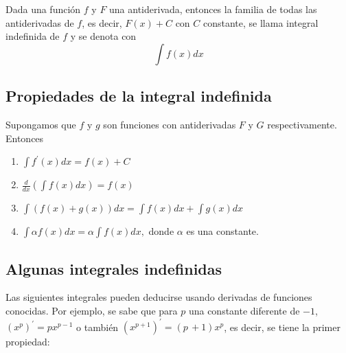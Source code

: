 \begin{defi}
\textnormal{Dada una función \textit{$f$} y \textit{$F$} una antiderivada, entonces la familia de todas las antiderivadas de \textit{$f$}, es decir, \textit{$F(x)+C$} con \textit{$C$} constante, se llama integral indefinida de \textit{$f$} y se denota con
\textit{\[
\int f(x)dx
\]}}
\end{defi}

\subsection*{Propiedades de la integral indefinida}
Supongamos que $f$ y $g$ son funciones con antiderivadas $F$ y $G$ respectivamente. Entonces
\begin{enumerate}[leftmargin=1.2em,   itemindent=0pt,       labelwidth=\labelwidth,labelsep=0.5em,]
\item $\displaystyle{\int f^{\prime }(x)dx=f(x)+C}$

\item $\displaystyle{\frac{d}{dx}\left(\int f(x)dx\right)=f(x)}$

\item $\displaystyle{\int \left(f(x)+g(x)\right)dx=\int f(x)dx+\int g(x)dx}$

\item $\displaystyle{\int \alpha f(x)dx=\alpha \int f(x)dx},$ donde $\alpha $ es una constante.
\end{enumerate}

\subsection*{Algunas integrales indefinidas}
Las siguientes integrales pueden deducirse usando derivadas de funciones conocidas. Por ejemplo, se sabe que para $p$ una constante diferente de $-1$, $(x^p)^\prime=px^{p-1}$ o también $(x^{p+1})^\prime=(p\,+1)x^{p}$, es decir, se tiene la primer propiedad:

